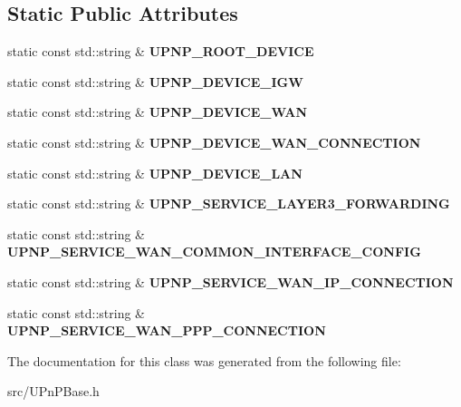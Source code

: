 \subsection*{Static Public Attributes}
\begin{DoxyCompactItemize}
\item 
static const std::string \& {\bfseries UPNP\_\-ROOT\_\-DEVICE}\label{classCUPnPLib_aae1382a487a6200a3b9d017badfe8bb5}

\item 
static const std::string \& {\bfseries UPNP\_\-DEVICE\_\-IGW}\label{classCUPnPLib_afcd367eaf19d2b2c059a2dec460a0773}

\item 
static const std::string \& {\bfseries UPNP\_\-DEVICE\_\-WAN}\label{classCUPnPLib_af8ecb981128cceabdecadcf71aaaccdb}

\item 
static const std::string \& {\bfseries UPNP\_\-DEVICE\_\-WAN\_\-CONNECTION}\label{classCUPnPLib_aecc9e0a074ababa44a4749bda9106aec}

\item 
static const std::string \& {\bfseries UPNP\_\-DEVICE\_\-LAN}\label{classCUPnPLib_a9f42102e92af9384545ccaf8a0895645}

\item 
static const std::string \& {\bfseries UPNP\_\-SERVICE\_\-LAYER3\_\-FORWARDING}\label{classCUPnPLib_a47cfae02e1a41edaf7851362e2869053}

\item 
static const std::string \& {\bfseries UPNP\_\-SERVICE\_\-WAN\_\-COMMON\_\-INTERFACE\_\-CONFIG}\label{classCUPnPLib_a02aa14c9032eaf1a74d3c41c00f132d2}

\item 
static const std::string \& {\bfseries UPNP\_\-SERVICE\_\-WAN\_\-IP\_\-CONNECTION}\label{classCUPnPLib_a80c78fc800afa0db1f3be4e50c0a0173}

\item 
static const std::string \& {\bfseries UPNP\_\-SERVICE\_\-WAN\_\-PPP\_\-CONNECTION}\label{classCUPnPLib_a66f728c3d02d78e08d0eb588a87476b5}

\end{DoxyCompactItemize}


The documentation for this class was generated from the following file:\begin{DoxyCompactItemize}
\item 
src/UPnPBase.h\end{DoxyCompactItemize}
